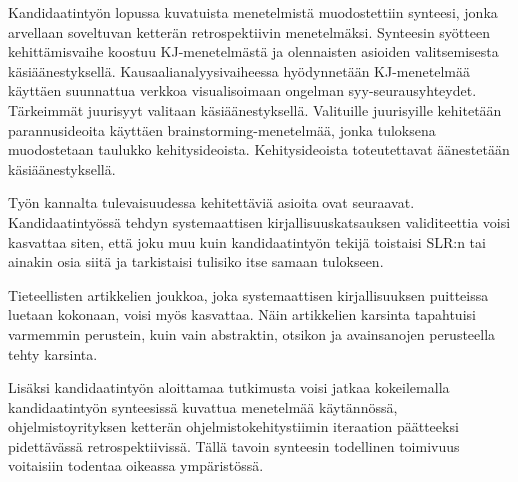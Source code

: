 Kandidaatintyön lopussa kuvatuista menetelmistä muodostettiin synteesi, jonka arvellaan soveltuvan ketterän retrospektiivin menetelmäksi. Synteesin syötteen kehittämisvaihe koostuu KJ-menetelmästä ja olennaisten asioiden valitsemisesta käsiäänestyksellä. Kausaalianalyysivaiheessa hyödynnetään KJ-menetelmää käyttäen suunnattua verkkoa visualisoimaan ongelman syy-seurausyhteydet. Tärkeimmät juurisyyt valitaan käsiäänestyksellä. Valituille juurisyille kehitetään parannusideoita käyttäen brainstorming-menetelmää, jonka tuloksena muodostetaan taulukko kehitysideoista. Kehitysideoista toteutettavat äänestetään käsiäänestyksellä.

Työn kannalta tulevaisuudessa kehitettäviä asioita ovat seuraavat. Kandidaatintyössä tehdyn systemaattisen kirjallisuuskatsauksen validiteettia voisi kasvattaa siten, että joku muu kuin kandidaatintyön tekijä toistaisi SLR:n tai ainakin osia siitä ja tarkistaisi tulisiko itse samaan tulokseen.

Tieteellisten artikkelien joukkoa, joka systemaattisen kirjallisuuksen puitteissa luetaan kokonaan, voisi myös kasvattaa. Näin artikkelien karsinta tapahtuisi varmemmin perustein, kuin vain abstraktin, otsikon ja avainsanojen perusteella tehty karsinta.

Lisäksi kandidaatintyön aloittamaa tutkimusta voisi jatkaa kokeilemalla kandidaatintyön synteesissä kuvattua menetelmää käytännössä, ohjelmistoyrityksen ketterän ohjelmistokehitystiimin iteraation päätteeksi pidettävässä retrospektiivissä. Tällä tavoin synteesin todellinen toimivuus voitaisiin todentaa oikeassa ympäristössä.
